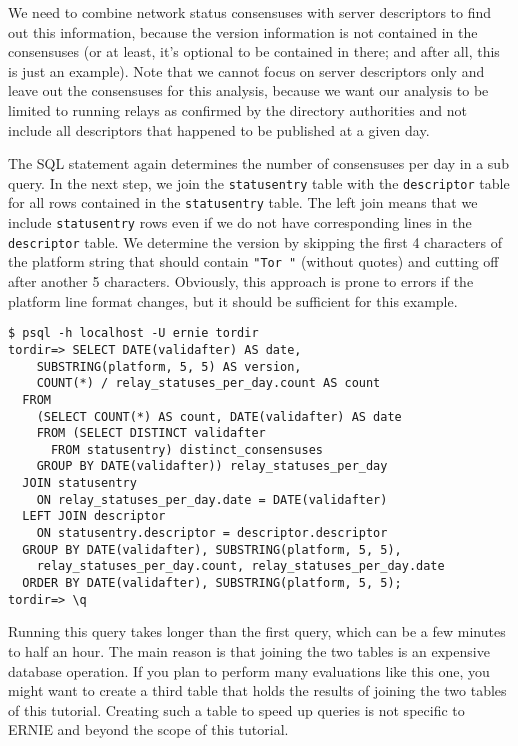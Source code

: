 \documentclass{article}
\begin{document}
We need to combine network status consensuses with server descriptors to
find out this information, because the version information is not
contained in the consensuses (or at least, it's optional to be contained
in there; and after all, this is just an example).
Note that we cannot focus on server descriptors only and leave out the
consensuses for this analysis, because we want our analysis to be limited
to running relays as confirmed by the directory authorities and not
include all descriptors that happened to be published at a given day.

The SQL statement again determines the number of consensuses per day in a
sub query.
In the next step, we join the \verb+statusentry+ table with the
\verb+descriptor+ table for all rows contained in the \verb+statusentry+
table.
The left join means that we include \verb+statusentry+ rows even if we do
not have corresponding lines in the \verb+descriptor+ table.
We determine the version by skipping the first 4 characters of the platform
string that should contain \verb+"Tor "+ (without quotes) and cutting off
after another 5 characters.
Obviously, this approach is prone to errors if the platform line format
changes, but it should be sufficient for this example.

\begin{verbatim}
$ psql -h localhost -U ernie tordir
tordir=> SELECT DATE(validafter) AS date,
    SUBSTRING(platform, 5, 5) AS version,
    COUNT(*) / relay_statuses_per_day.count AS count
  FROM
    (SELECT COUNT(*) AS count, DATE(validafter) AS date
    FROM (SELECT DISTINCT validafter
      FROM statusentry) distinct_consensuses
    GROUP BY DATE(validafter)) relay_statuses_per_day
  JOIN statusentry
    ON relay_statuses_per_day.date = DATE(validafter)
  LEFT JOIN descriptor
    ON statusentry.descriptor = descriptor.descriptor
  GROUP BY DATE(validafter), SUBSTRING(platform, 5, 5),
    relay_statuses_per_day.count, relay_statuses_per_day.date
  ORDER BY DATE(validafter), SUBSTRING(platform, 5, 5);
tordir=> \q
\end{verbatim}

Running this query takes longer than the first query, which can be a few
minutes to half an hour.
The main reason is that joining the two tables is an expensive database
operation.
If you plan to perform many evaluations like this one, you might want to
create a third table that holds the results of joining the two tables of
this tutorial.
Creating such a table to speed up queries is not specific to ERNIE and
beyond the scope of this tutorial.
\end{document}

